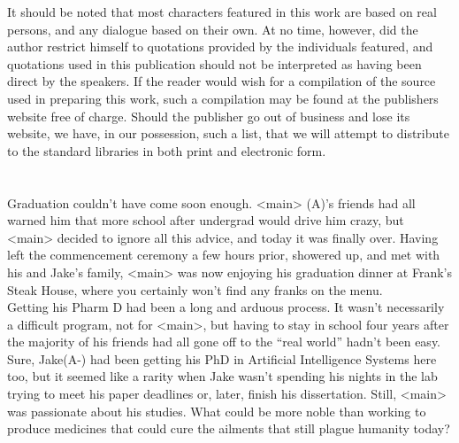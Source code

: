 \documentclass[12pt,openany]{memoir}
\begin{document}
It should be noted that most characters featured in this work are based on real persons, and any dialogue based on their own.
At no time, however, did the author restrict himself to quotations provided by the individuals featured, and quotations used in this publication should not be interpreted as having been direct by the speakers.
If the reader would wish for a compilation of the source used in preparing this work, such a compilation may be found at the publishers website free of charge.
Should the publisher go out of business and lose its website, we have, in our possession, such a list, that we will attempt to distribute to the standard libraries in both print and electronic form.
\\

\chapter{}

Graduation couldn't have come soon enough.
<main> (A)'s friends had all warned him that more school after undergrad would drive him crazy, but <main> decided to ignore all this advice, and today it was finally over.  Having left the commencement ceremony a few hours prior, showered up, and met with his and Jake's family, <main> was now enjoying his graduation dinner at Frank's Steak House, where you certainly won't find any franks on the menu.
\\

Getting his Pharm D had been a long and arduous process.
It wasn't necessarily a difficult program, not for <main>, but having to stay in school four years after the majority of his friends had all gone off to the ``real world'' hadn't been easy.  Sure, Jake(A-) had been getting his PhD in Artificial Intelligence Systems here too, but it seemed like a rarity when Jake wasn't spending his nights in the lab trying to meet his paper deadlines or, later, finish his dissertation.  Still, <main> was passionate about his studies.  What could be more noble than working to produce medicines that could cure the ailments that still plague humanity today?
\\
\end{document}
